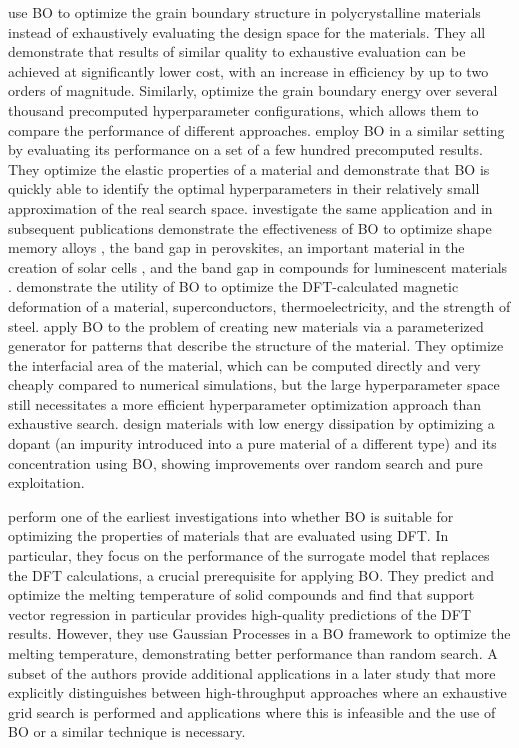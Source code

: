 \documentclass{article}
\begin{document}
\cite{kiyohara_acceleration_2016,kikuchi2018,bondevik2019} use BO to optimize
the grain boundary structure in polycrystalline materials instead of
exhaustively evaluating the design space for the materials. They all demonstrate
that results of similar quality to exhaustive evaluation can be achieved at
significantly lower cost, with an increase in efficiency by up to two orders of
magnitude. Similarly, \cite{ueno_combo_2016} optimize the grain boundary energy
over several thousand precomputed hyperparameter configurations, which allows
them to compare the performance of different approaches.
\cite{talapatra_autonomous_2018} employ BO in a similar setting by evaluating
its performance on a set of a few hundred precomputed results. They optimize the
elastic properties of a material and demonstrate that BO is quickly able to
identify the optimal hyperparameters in their relatively small approximation of
the real search space. \cite{balachandran_adaptive_2016} investigate the same
application and in subsequent publications demonstrate the effectiveness of BO
to optimize shape memory alloys \cite{xue_accelerated_2016}, the band gap in
perovskites, an important material in the creation of solar cells
\cite{pilania_multi-fidelity_2017}, and the band gap in compounds for
luminescent materials \cite{lookman_active_2019}.
\cite{ling_high-dimensional_2017} demonstrate the utility of BO to optimize the
DFT-calculated magnetic deformation of a material, superconductors,
thermoelectricity, and the strength of steel. \cite{hankins_bio-like_2019} apply
BO to the problem of creating new materials via a parameterized generator for
patterns that describe the structure of the material. They optimize the
interfacial area of the material, which can be computed directly and very
cheaply compared to numerical simulations, but the large hyperparameter space
still necessitates a more efficient hyperparameter optimization approach than
exhaustive search. \cite{dehghannasiri_optimal_2017} design materials with low
energy dissipation by optimizing a dopant (an impurity introduced into a pure
material of a different type) and its concentration using BO, showing
improvements over random search and pure exploitation.

\cite{seko_machine_2014} perform one of the earliest investigations into whether
BO is suitable for optimizing the properties of materials that are evaluated
using DFT. In particular, they focus on the performance of the surrogate model
that replaces the DFT calculations, a crucial prerequisite for applying BO. They
predict and optimize the melting temperature of solid compounds and find that
support vector regression in particular provides high-quality predictions of the
DFT results. However, they use Gaussian Processes in a BO framework to optimize
the melting temperature, demonstrating better performance than random search. A
subset of the authors provide additional applications in a later study
\cite{tanaka_toward_2016} that more explicitly distinguishes between
high-throughput approaches where an exhaustive grid search is performed and
applications where this is infeasible and the use of BO or a similar technique
is necessary.
\end{document}
